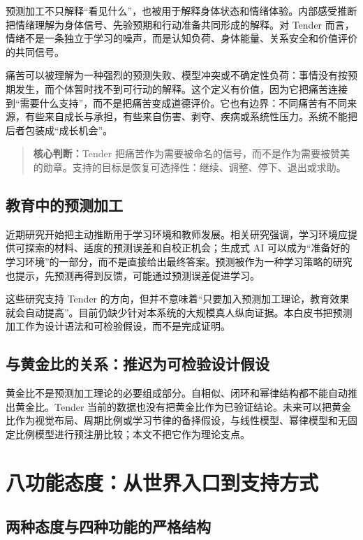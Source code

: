 \documentclass[UTF8,a4paper,11pt]{ctexart}
\newcommand{\keypoint}[1]{\begin{quote}\noindent\textbf{\color{TenderBlue}核心判断：}#1\end{quote}}
\begin{document}
预测加工不只解释“看见什么”，也被用于解释身体状态和情绪体验。内部感受推断把情绪理解为身体信号、先验预期和行动准备共同形成的解释\cite{Seth2013}。对 Tender 而言，情绪不是一条独立于学习的噪声，而是认知负荷、身体能量、关系安全和价值评价的共同信号。

痛苦可以被理解为一种强烈的预测失败、模型冲突或不确定性负荷：事情没有按预期发生，而个体暂时找不到可行动的解释。这个定义有价值，因为它把痛苦连接到“需要什么支持”，而不是把痛苦变成道德评价。它也有边界：不同痛苦有不同来源，有些来自成长与承担，有些来自伤害、剥夺、疾病或系统性压力。系统不能把后者包装成“成长机会”。

\keypoint{Tender 把痛苦作为需要被命名的信号，而不是作为需要被赞美的勋章。支持的目标是恢复可选择性：继续、调整、停下、退出或求助。}

\subsection{教育中的预测加工}

近期研究开始把主动推断用于学习环境和教师发展。相关研究强调，学习环境应提供可探索的材料、适度的预测误差和自校正机会；生成式 AI 可以成为“准备好的学习环境”的一部分，而不是直接给出最终答案\cite{ActiveInferenceSchool2024,TeacherDevelopment2026}。预测被作为一种学习策略的研究也提示，先预测再得到反馈，可能通过预测误差促进学习\cite{Brod2021}。

这些研究支持 Tender 的方向，但并不意味着“只要加入预测加工理论，教育效果就会自动提高”。目前仍缺少针对本系统的大规模真人纵向证据。本白皮书把预测加工作为设计语法和可检验假设，而不是完成证明。

\subsection{与黄金比的关系：推迟为可检验设计假设}

黄金比不是预测加工理论的必要组成部分。自相似、闭环和幂律结构都不能自动推出黄金比。Tender 当前的数据也没有把黄金比作为已验证结论。未来可以把黄金比作为视觉布局、周期比例或学习节律的备择假设，与线性模型、幂律模型和无固定比例模型进行预注册比较；本文不把它作为理论支点。

\newpage

\section{八功能态度：从世界入口到支持方式}

\subsection{两种态度与四种功能的严格结构}
\end{document}

